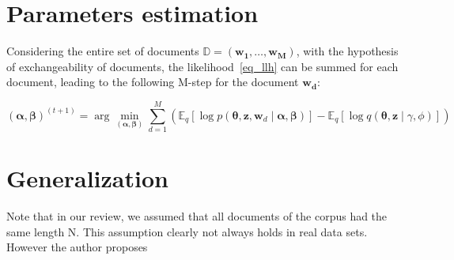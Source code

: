 \documentclass[12pt,a4paper,onecolumn]{article}
\begin{document}
\section{Parameters estimation}
 
 
 Considering the entire set of documents \(\mathbb{D} = (\bm{w_1}, \dots, \bm{w_M})\), with the hypothesis of exchangeability of documents, the likelihood~\eqref{eq_llh} can be summed for each document, leading to the following M-step for the document \(\bm{w_d}\):
 
 \begin{equation}
	(\bm{\alpha}, \bm{\beta})^{(t+1)} = \operatorname{arg}\min_{(\bm{\alpha}, \bm{\beta})} \sum_{d=1}^M\left(\mathbb{E}_{q}\left[\log p(\bm{\theta},\bm{z}, \bm{w}_d \mid \bm{\alpha}, \bm{\beta})\right] - \mathbb{E}_{q}\left[\log q(\bm{\theta}, \bm{z} \mid \gamma, \phi)\right]\right)          \tag{M-step} 
\end{equation}


\section{Generalization}

Note that in our review, we assumed that all documents of the corpus had the same length N. This assumption clearly not always holds in real data sets. However the author proposes 
\end{document}
